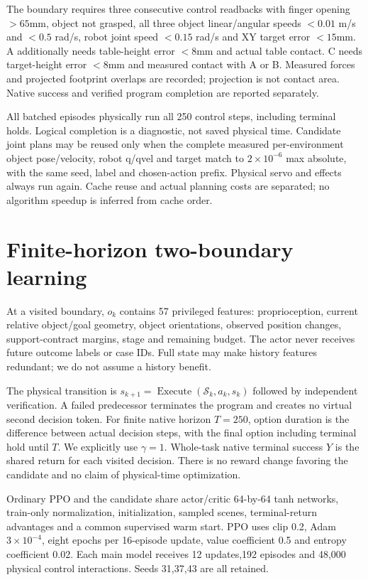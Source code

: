 \documentclass[10pt]{article}
\begin{document}
The boundary requires three consecutive control readbacks with finger opening $>65$mm, object not grasped, all three object linear/angular speeds $<0.01$ m/s and $<0.5$ rad/s, robot joint speed $<0.15$ rad/s and XY target error $<15$mm. A additionally needs table-height error $<8$mm and actual table contact. C needs target-height error $<8$mm and measured contact with A or B. Measured forces and projected footprint overlaps are recorded; projection is not contact area. Native success and verified program completion are reported separately.

All batched episodes physically run all 250 control steps, including terminal holds. Logical completion is a diagnostic, not saved physical time. Candidate joint plans may be reused only when the complete measured per-environment object pose/velocity, robot q/qvel and target match to $2\times 10^{-6}$ max absolute, with the same seed, label and chosen-action prefix. Physical servo and effects always run again. Cache reuse and actual planning costs are separated; no algorithm speedup is inferred from cache order.
\section{Finite-horizon two-boundary learning}
At a visited boundary, $o_k$ contains 57 privileged features: proprioception, current relative object/goal geometry, object orientations, observed position changes, support-contract margins, stage and remaining budget. The actor never receives future outcome labels or case IDs. Full state may make history features redundant; we do not assume a history benefit.

The physical transition is $s_{k+1}=\operatorname{Execute}(\mathcal S_k,a_k,s_k)$ followed by independent verification. A failed predecessor terminates the program and creates no virtual second decision token. For finite native horizon $T=250$, option duration is the difference between actual decision steps, with the final option including terminal hold until $T$. We explicitly use $\gamma=1$. Whole-task native terminal success $Y$ is the shared return for each visited decision. There is no reward change favoring the candidate and no claim of physical-time optimization.

Ordinary PPO and the candidate share actor/critic 64-by-64 tanh networks, train-only normalization, initialization, sampled scenes, terminal-return advantages and a common supervised warm start. PPO uses clip 0.2, Adam $3\times 10^{-4}$, eight epochs per 16-episode update, value coefficient 0.5 and entropy coefficient 0.02. Each main model receives 12 updates,192 episodes and 48,000 physical control interactions. Seeds 31,37,43 are all retained.
\end{document}
